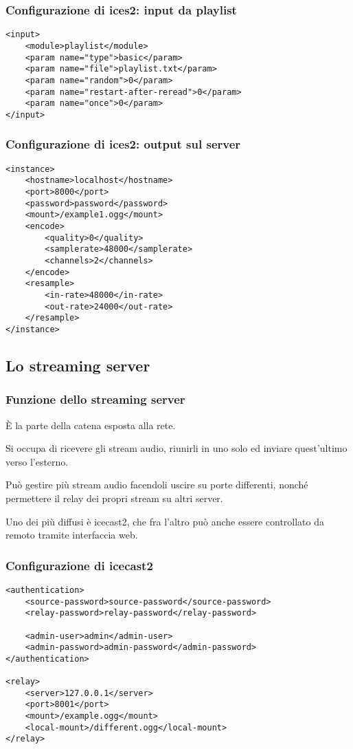 \documentclass{beamer}
\begin{document}
\begin{frame}
\frametitle{Configurazione di ices2: input da playlist}
\begin{verbatim}
<input>
    <module>playlist</module>
    <param name="type">basic</param>
    <param name="file">playlist.txt</param>
    <param name="random">0</param>
    <param name="restart-after-reread">0</param>
    <param name="once">0</param>
</input>
\end{verbatim}
\end{frame}

\begin{frame}
\frametitle{Configurazione di ices2: output sul server}
\footnotesize
\begin{verbatim}
<instance>
    <hostname>localhost</hostname>
    <port>8000</port>
    <password>password</password>
    <mount>/example1.ogg</mount>
    <encode>
        <quality>0</quality>
        <samplerate>48000</samplerate>
        <channels>2</channels>
    </encode>
    <resample>
        <in-rate>48000</in-rate>
        <out-rate>24000</out-rate>
    </resample>
</instance>
\end{verbatim}
\end{frame}

\subsection{Lo streaming server}

\begin{frame}\frametitle{Funzione dello streaming server}
È la parte della catena esposta alla rete.

Si occupa di ricevere gli stream audio, riunirli in uno solo ed
inviare quest'ultimo verso l'esterno.

Può gestire più stream audio facendoli uscire su porte differenti,
nonché permettere il relay dei propri stream su altri server.

Uno dei più diffusi è icecast2, che fra l'altro può anche essere
controllato da remoto tramite interfaccia web.
\end{frame}

\begin{frame}
\frametitle{Configurazione di icecast2}
\footnotesize
\begin{verbatim}
<authentication>
    <source-password>source-password</source-password>
    <relay-password>relay-password</relay-password>

    <admin-user>admin</admin-user>
    <admin-password>admin-password</admin-password>
</authentication>

<relay>
    <server>127.0.0.1</server>
    <port>8001</port>
    <mount>/example.ogg</mount>
    <local-mount>/different.ogg</local-mount>
</relay>
\end{verbatim}
\end{frame}
\end{document}
